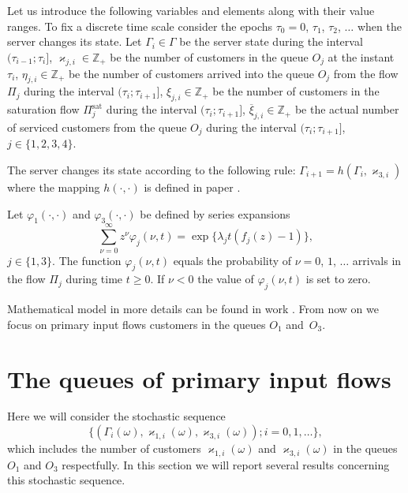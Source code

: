 \documentclass[60x84/16,10pt]{dccn}
\begin{document}
{Let us  introduce the following variables and elements along with their
value ranges. To fix a discrete time scale consider the epochs $\tau_0=0$, $\tau_1$, $\tau_2$,
$\ldots$ when the server changes its state. Let $\Gamma_i\in\Gamma$ be the server state
during the interval $(\tau_{i-1};\tau_i]$, $\varkappa_{j,i} \in \mathbb{Z}_+ $ be the number of customers in
the queue $O_j$ at the instant $\tau_i$, $\eta_{j,i} \in \mathbb{Z}_+$ be the number of customers
arrived into the queue $O_j$ from the flow $\Pi_j$ during the interval $(\tau_{i};\tau_{i+1}]$, $\xi_{j,i} \in
\mathbb{Z}_+$ be the number of customers in the saturation flow $\Pi^{\mathrm{\text{sat}}}_j$ during
the interval $(\tau_{i};\tau_{i+1}]$, $\overline{\xi}_{j,i}\in \mathbb{Z}_+$ be the actual number of 
serviced customers from the queue  $O_j$ during the interval $(\tau_{i};\tau_{i+1}]$, $j\in
\{1,2,3,4\}$.

The server changes its state according to the following rule:
$
\Gamma_{i+1}=h(\Gamma_i,\varkappa_{3,i})
$
where the mapping $h(\cdot,\cdot)$ is defined in paper \cite{k:z:2016:2}.

Let $\varphi_1(\cdot,\cdot)$ and $\varphi_3(\cdot,\cdot)$ be defined by series expansions
\begin{equation*}
\sum_{\nu=0}^{\infty} z^\nu\varphi_j(\nu,t) = \exp\{\lambda_j t (f_j(z)-1)\},
\end{equation*}
$j \in \{1,3\}$. The function
$\varphi_j(\nu,t)$ equals the probability of  $\nu=0$, $1$, $\ldots${} arrivals in the flow
$\Pi_j$ during time $t \geqslant 0$. If $\nu < 0$ the value of $\varphi_j(\nu,t)$ is set to
zero.

Mathematical model in more details can be found in work \cite{k:z:2016}. From
now on we focus on primary input flows customers in the queues $O_1$ and~$O_3$.

\section{The queues of primary input flows}
Here we will consider the stochastic sequence
\begin{equation}
\label{eq:theMC}
\{(\Gamma_i(\omega), \varkappa_{1,i}(\omega),\varkappa_{3,i}(\omega)); i =0, 1, \ldots\},
\end{equation}
which includes the number of customers $\varkappa_{1, i}(\omega)$ and $\varkappa_{3, i}(\omega)$ in the queues $O_1$ and $O_3$ respectfully.  In this
section we will report several results concerning this stochastic sequence.


}
\end{document}
